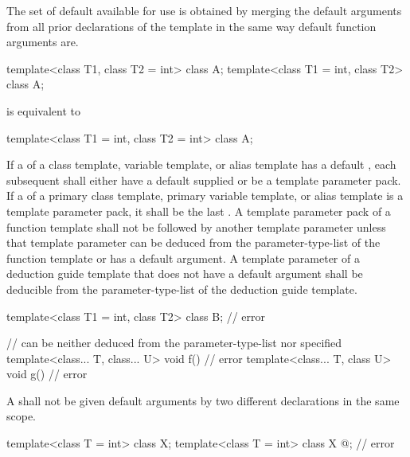 \pnum
The set of default
available for use is obtained by merging the default arguments
from all prior declarations of the template in the
same way default function arguments are.
\begin{example}
\begin{codeblock}
template<class T1, class T2 = int> class A;
template<class T1 = int, class T2> class A;
\end{codeblock}
is equivalent to
\begin{codeblock}
template<class T1 = int, class T2 = int> class A;
\end{codeblock}
\end{example}

\pnum
If a
of a class template, variable template, or alias template has a default
,
each subsequent
shall either have a default
supplied
or be a template parameter pack. If a 
of a primary class template, primary variable template, or alias template
is a template parameter pack, it shall be the last
.
A template parameter pack of a function template shall not be followed by
another
template parameter unless that template parameter can be deduced from the
parameter-type-list of the function template or has a
default argument.
A template parameter of a deduction guide template
that does not have a default argument
shall be deducible
from the parameter-type-list
of the deduction guide template.
\begin{example}
\begin{codeblock}
template<class T1 = int, class T2> class B;     // error

//  can be neither deduced from the parameter-type-list nor specified
template<class... T, class... U> void f() { }   // error
template<class... T, class U> void g() { }      // error
\end{codeblock}
\end{example}

\pnum
A
shall
not be given default arguments by two different declarations in the same scope.
\begin{example}
\begin{codeblock}
template<class T = int> class X;
template<class T = int> class X { @\commentellip@ };  // error
\end{codeblock}
\end{example}

